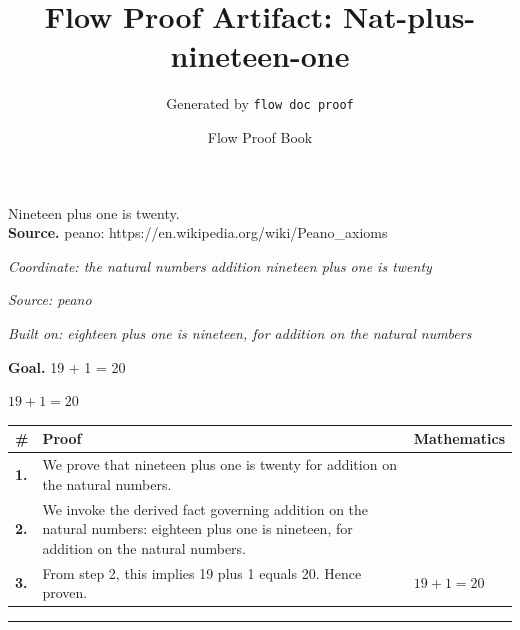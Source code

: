 \documentclass[11pt]{article}
\title{Flow Proof Artifact: Nat-plus-nineteen-one}
\author{Generated by \texttt{flow doc proof}}
\date{Flow Proof Book}
\theoremstyle{definition}
\begin{document}
\maketitle
Nineteen plus one is twenty.\\[0.5em]
\textbf{Source.} peano: https://en.wikipedia.org/wiki/Peano\_axioms\\[0.5em]
\bigskip
{}\par
\smallskip\noindent\textit{Coordinate: the natural numbers \cdot addition \cdot nineteen plus one is twenty}\par
\smallskip\noindent\textit{Source: peano}\par
\smallskip\noindent\textit{Built on: eighteen plus one is nineteen, for addition on the natural numbers}\par
\medskip
\noindent\textbf{Goal.} 19 + 1 = 20\par
\noindent$\displaystyle 19 + 1 = 20$\par
\medskip
\noindent
\begin{tabular}{@{} >{\raggedright\arraybackslash}p{} >{\raggedright\arraybackslash}p{} >{\raggedleft\arraybackslash}p{} @{}}
\textbf{\#} & \textbf{Proof} & \textbf{Mathematics} \\
\midrule
\textbf{1.} & We prove that nineteen plus one is twenty for addition on the natural numbers. & \\[0.45em]
\textbf{2.} & We invoke the derived fact governing addition on the natural numbers: eighteen plus one is nineteen, for addition on the natural numbers. & \\[0.45em]
\textbf{3.} & From step 2, this implies 19 plus 1 equals 20. Hence proven. & $\displaystyle 19 + 1 = 20$ \\[0.45em]
\bottomrule
\end{tabular}
\label{thm:Nat-addition-nineteen_plus_one_is_twenty}
\par\medskip\hrule
\end{document}
